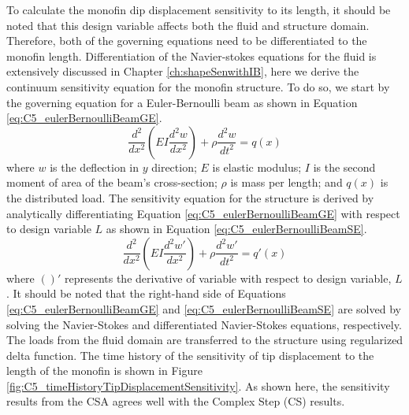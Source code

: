 %
To calculate the monofin dip displacement sensitivity to its length, it should be noted that this design variable affects both the fluid and structure domain. Therefore, both of the governing equations need to be differentiated to the monofin length. Differentiation of the Navier-stokes equations for the fluid is extensively discussed in Chapter \ref{ch:shapeSenwithIB}, here we derive the continuum sensitivity equation for the monofin structure. To do so, we start by the governing equation for a Euler-Bernoulli beam as shown in Equation \eqref{eq:C5_eulerBernoulliBeamGE}.
%
\begin{equation}\label{eq:C5_eulerBernoulliBeamGE}
	\frac{d^2}{dx^2}
	\left( EI \frac{d^2 w}{dx^2} \right) + \rho \frac{d^2 w}{dt^2} = q(x)
\end{equation}
%
where $w$ is the deflection in $y$ direction; $E$ is elastic modulus; $I$ is the second moment of area of the beam's cross-section; $\rho$ is mass per length; and $q(x)$ is the distributed load. The sensitivity equation for the structure is derived by analytically differentiating Equation \eqref{eq:C5_eulerBernoulliBeamGE} with respect to design variable $L$ as shown in Equation \eqref{eq:C5_eulerBernoulliBeamSE}.
%
\begin{equation}\label{eq:C5_eulerBernoulliBeamSE}
	\frac{d^2}{dx^2}
	\left( EI \frac{d^2 w'}{dx^2} \right) + \rho \frac{d^2 w'}{dt^2} = q'(x)
\end{equation}
%
where $( )'$ represents the derivative of variable with respect to design variable, $L$. It should be noted that the right-hand side of Equations \eqref{eq:C5_eulerBernoulliBeamGE} and \eqref{eq:C5_eulerBernoulliBeamSE} are solved by solving the Navier-Stokes and differentiated Navier-Stokes equations, respectively. The loads from the fluid domain are transferred to the structure using regularized delta function. The time history of the sensitivity of tip displacement to the length of the monofin is shown in Figure \ref{fig:C5_timeHistoryTipDisplacementSensitivity}. As shown here, the sensitivity results from the CSA agrees well with the Complex Step (CS) results.
%
